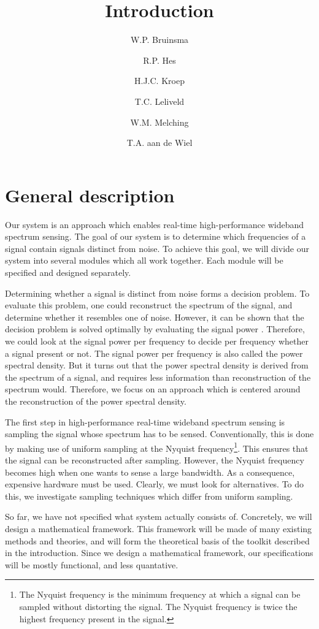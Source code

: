 \documentclass[a4paper, openany, oneside]{memoir}
\title{Introduction}
\author{W.P. Bruinsma \and R.P. Hes \and H.J.C. Kroep \and T.C. Leliveld \and W.M. Melching \and T.A. aan de Wiel}
\begin{document}
\section{General description}
Our system is an approach which enables real-time high-performance wideband spectrum sensing. The goal of our system is to determine which frequencies of a signal contain signals distinct from noise. To achieve this goal, we will divide our system into several modules which all work together. Each module will be specified and designed separately.

Determining whether a signal is distinct from noise forms a decision problem. To evaluate this problem, one could reconstruct the spectrum of the signal, and determine whether it resembles one of noise. However, it can be shown that the decision problem is solved optimally by evaluating the signal power \cite{axell2012spectrum}. Therefore, we could look at the signal power per frequency to decide per frequency whether a signal present or not. The signal power per frequency is also called the power spectral density. But it turns out that the power spectral density is derived from the spectrum of a signal, and requires less information than reconstruction of the spectrum would. Therefore, we focus on an approach which is centered around the reconstruction of the power spectral density.

The first step in high-performance real-time wideband spectrum sensing is sampling the signal whose spectrum has to be sensed. Conventionally, this is done by making use of uniform sampling at the Nyquist frequency\footnote{The Nyquist frequency is the minimum frequency at which a signal can be sampled without distorting the signal. The Nyquist frequency is twice the highest frequency present in the signal.}. This ensures that the signal can be reconstructed after sampling. However, the Nyquist frequency becomes high when one wants to sense a large bandwidth. As a consequence, expensive hardware must be used. Clearly, we must look for alternatives. To do this, we investigate sampling techniques which differ from uniform sampling.

So far, we have not specified what system actually consists of. Concretely, we will design a mathematical framework. This framework will be made of many existing methods and theories, and will form the theoretical basis of the toolkit described in the introduction. Since we design a mathematical framework, our specifications will be mostly functional, and less quantative. 
\end{document}
